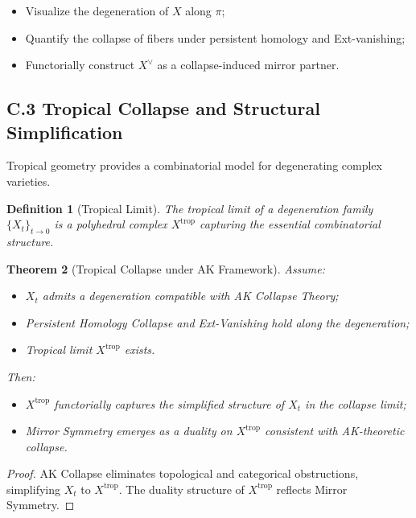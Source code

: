 \documentclass[11pt]{article}
\newtheorem{theorem}{Theorem}[section]
\newtheorem{definition}[theorem]{Definition}
\begin{document}
\begin{itemize}
    \item Visualize the degeneration of $X$ along $\pi$;
    \item Quantify the collapse of fibers under persistent homology and Ext-vanishing;
    \item Functorially construct $X^\vee$ as a collapse-induced mirror partner.
\end{itemize}

\subsection*{C.3 Tropical Collapse and Structural Simplification}

Tropical geometry provides a combinatorial model for degenerating complex varieties.

\begin{definition}[Tropical Limit]
The tropical limit of a degeneration family $\{X_t\}_{t \to 0}$ is a polyhedral complex $X^{\mathrm{trop}}$ capturing the essential combinatorial structure.
\end{definition}

\begin{theorem}[Tropical Collapse under AK Framework]
Assume:

\begin{itemize}
    \item $X_t$ admits a degeneration compatible with AK Collapse Theory;
    \item Persistent Homology Collapse and Ext-Vanishing hold along the degeneration;
    \item Tropical limit $X^{\mathrm{trop}}$ exists.
\end{itemize}

Then:

\begin{itemize}
    \item $X^{\mathrm{trop}}$ functorially captures the simplified structure of $X_t$ in the collapse limit;
    \item Mirror Symmetry emerges as a duality on $X^{\mathrm{trop}}$ consistent with AK-theoretic collapse.
\end{itemize}
\end{theorem}

\begin{proof}
AK Collapse eliminates topological and categorical obstructions, simplifying $X_t$ to $X^{\mathrm{trop}}$. The duality structure of $X^{\mathrm{trop}}$ reflects Mirror Symmetry.
\end{proof}
\end{document}
